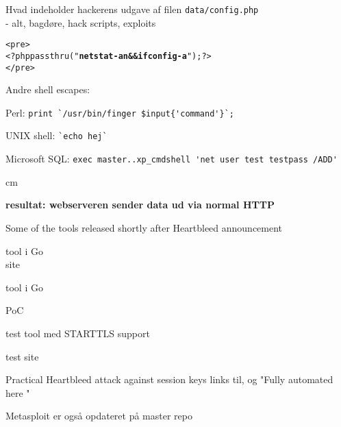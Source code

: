 \documentclass[Screen16to9,17pt]{foils}
\begin{document}



\begin{list1}
\item Hvad indeholder hackerens udgave af filen \verb+data/config.php+ \\
- alt, bagdøre, hack scripts, exploits
\end{list1}
\begin{alltt}
<pre>
<?php passthru("{\bfseries netstat -an && ifconfig -a}"); ?>
</pre>
\end{alltt}
\begin{list1}
\item Andre shell escapes:
\begin{list2}
\item Perl: \verb+print `/usr/bin/finger $input{'command'}`;+
\item UNIX shell: \verb+`echo hej`+
\item Microsoft SQL: \verb+exec master..xp_cmdshell 'net user test testpass /ADD'+
\end{list2}
\end{list1}

 cm

\centerline{\bfseries resultat: webserveren sender data ud via normal HTTP}



\centerline{Some of the tools released shortly after Heartbleed announcement}
\begin{list2}
\item {} tool i Go\\
site 
\item {} tool i Go
\item {} PoC
\item {} test tool med STARTTLS support
\item {} test site
\item {} Practical Heartbleed attack against session keys links til,  og "Fully automated here "\\ 

\item Metasploit er også opdateret på master repo\\ \\
\end{list2}
\end{document}
